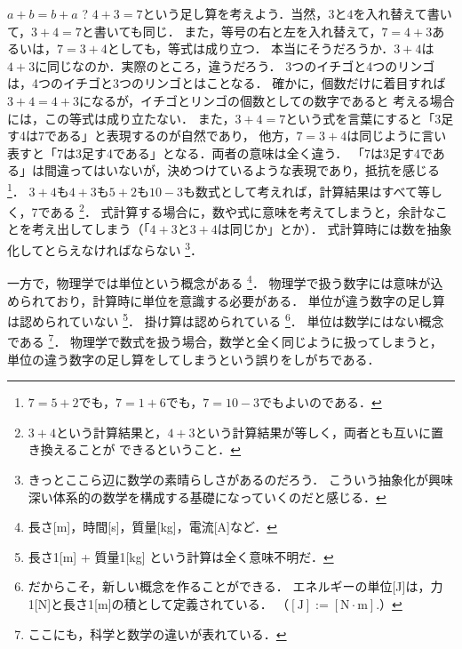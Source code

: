         \begin{memo}{$a+b=b+a$ ?}
            $4+3=7$という足し算を考えよう．当然，$3$と$4$を入れ替えて書いて，$3+4=7$と書いても同じ．
            また，等号の右と左を入れ替えて，$7=4+3$あるいは，$7=3+4$としても，等式は成り立つ．
            本当にそうだろうか．$3+4$は$4+3$に同じなのか．実際のところ，違うだろう．
            3つのイチゴと4つのリンゴは，4つのイチゴと3つのリンゴとはことなる．
            確かに，個数だけに着目すれば$3+4=4+3$になるが，イチゴとリンゴの個数としての数字であると
            考える場合には，この等式は成り立たない．
            また，$3+4=7$という式を言葉にすると「3足す4は7である」と表現するのが自然であり，
            他方，$7=3+4$は同じように言い表すと「7は3足す4である」となる．両者の意味は全く違う．
            「7は3足す4である」は間違ってはいないが，決めつけているような表現であり，抵抗を感じる
                \footnote{
                    $7=5+2$でも，$7=1+6$でも，$7=10-3$でもよいのである．
                }．
            $3+4$も$4+3$も$5+2$も$10-3$も数式として考えれば，計算結果はすべて等しく，7である
                \footnote{
                    $3+4$という計算結果と，$4+3$という計算結果が等しく，両者とも互いに置き換えることが
                    できるということ．
                }．
            式計算する場合に，数や式に意味を考えてしまうと，余計なことを考え出してしまう（「$4+3$と$3+4$は同じか」とか）．
            式計算時には数を抽象化してとらえなければならない
                \footnote{
                    きっとここら辺に数学の素晴らしさがあるのだろう．
                    こういう抽象化が興味深い体系的の数学を構成する基礎になっていくのだと感じる．
                }．

            一方で，物理学では単位という概念がある
                \footnote{
                    長さ[m]，時間[s]，質量[kg]，電流[A]など．
                }．
            物理学で扱う数字には意味が込められており，計算時に単位を意識する必要がある．
            単位が違う数字の足し算は認められていない
                \footnote{
                    長さ1[m] + 質量1[kg] という計算は全く意味不明だ．
                }．
            掛け算は認められている
                \footnote{
                    だからこそ，新しい概念を作ることができる．
                    エネルギーの単位[J]は，力1[N]と長さ1[m]の積として定義されている．
                    （$[\mbox{J}] := [\mbox{N} \cdot \mbox{m}].$）
                }．
            単位は数学にはない概念である
                \footnote{
                    ここにも，科学と数学の違いが表れている．
                }．
            物理学で数式を扱う場合，数学と全く同じように扱ってしまうと，
            単位の違う数字の足し算をしてしまうという誤りをしがちである．
        \end{memo}

